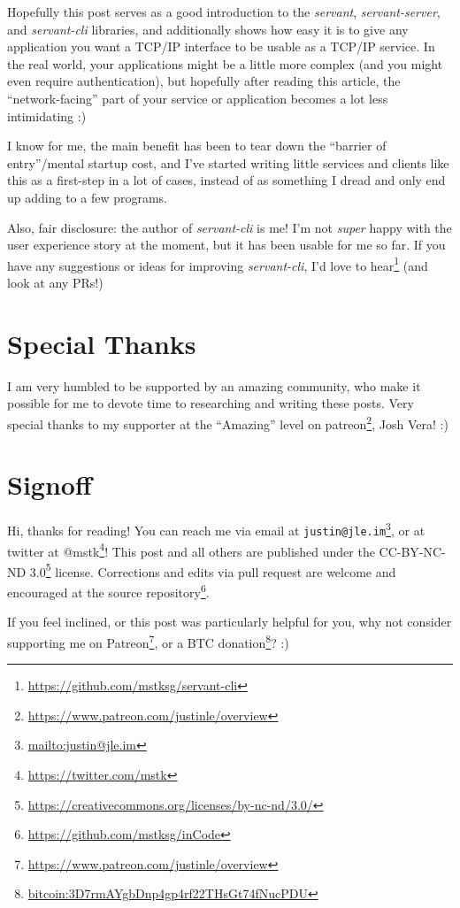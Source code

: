 \documentclass[]{article}
\renewcommand{\href}[2]{#2\footnote{\url{#1}}}
\begin{document}
Hopefully this post serves as a good introduction to the \emph{servant},
\emph{servant-server}, and \emph{servant-cli} libraries, and additionally shows
how easy it is to give any application you want a TCP/IP interface to be usable
as a TCP/IP service. In the real world, your applications might be a little more
complex (and you might even require authentication), but hopefully after reading
this article, the ``network-facing'' part of your service or application becomes
a lot less intimidating :)

I know for me, the main benefit has been to tear down the ``barrier of
entry''/mental startup cost, and I've started writing little services and
clients like this as a first-step in a lot of cases, instead of as something I
dread and only end up adding to a few programs.

Also, fair disclosure: the author of \emph{servant-cli} is me! I'm not
\emph{super} happy with the user experience story at the moment, but it has been
usable for me so far. If you have any suggestions or ideas for improving
\emph{servant-cli}, I'd \href{https://github.com/mstksg/servant-cli}{love to
hear} (and look at any PRs!)

\section{Special Thanks}\label{special-thanks}

I am very humbled to be supported by an amazing community, who make it possible
for me to devote time to researching and writing these posts. Very special
thanks to my supporter at the ``Amazing'' level on
\href{https://www.patreon.com/justinle/overview}{patreon}, Josh Vera! :)

\section{Signoff}\label{signoff}

Hi, thanks for reading! You can reach me via email at
\href{mailto:justin@jle.im}{\nolinkurl{justin@jle.im}}, or at twitter at
\href{https://twitter.com/mstk}{@mstk}! This post and all others are published
under the \href{https://creativecommons.org/licenses/by-nc-nd/3.0/}{CC-BY-NC-ND
3.0} license. Corrections and edits via pull request are welcome and encouraged
at \href{https://github.com/mstksg/inCode}{the source repository}.

If you feel inclined, or this post was particularly helpful for you, why not
consider \href{https://www.patreon.com/justinle/overview}{supporting me on
Patreon}, or a \href{bitcoin:3D7rmAYgbDnp4gp4rf22THsGt74fNucPDU}{BTC donation}?
:)
\end{document}
